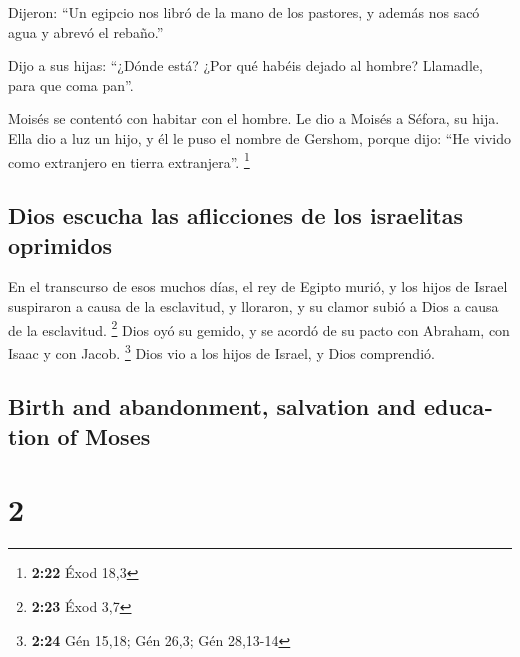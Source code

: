 \begin{paracol}{2}
 Dijeron: ``Un egipcio nos libró de la mano de los
pastores, y además nos sacó agua y abrevó el rebaño.''

 Dijo a sus hijas: ``¿Dónde está? ¿Por qué habéis dejado
al hombre? Llamadle, para que coma pan''.

 Moisés se contentó con habitar con el hombre. Le dio a
Moisés a Séfora, su hija.  Ella dio a luz un hijo, y él
le puso el nombre de Gershom, porque dijo: ``He vivido como extranjero
en tierra extranjera''. \footnote{\textbf{2:22} Éxod 18,3}

\hypertarget{dios-escucha-las-aflicciones-de-los-israelitas-oprimidos}{%
\subsection{Dios escucha las aflicciones de los israelitas
oprimidos}\label{dios-escucha-las-aflicciones-de-los-israelitas-oprimidos}}

 En el transcurso de esos muchos días, el rey de Egipto
murió, y los hijos de Israel suspiraron a causa de la esclavitud, y
lloraron, y su clamor subió a Dios a causa de la esclavitud. \footnote{\textbf{2:23}
  Éxod 3,7}  Dios oyó su gemido, y se acordó de su pacto
con Abraham, con Isaac y con Jacob. \footnote{\textbf{2:24} Gén 15,18;
  Gén 26,3; Gén 28,13-14}  Dios vio a los hijos de
Israel, y Dios comprendió.

\switchcolumn
\begin{otherlanguage}{english}

\hypertarget{birth-and-abandonment-salvation-and-education-of-moses}{%
\subsection{Birth and abandonment, salvation and education of
Moses}\label{birth-and-abandonment-salvation-and-education-of-moses}}

\hypertarget{section-3}{%
\section{2}\label{section-3}}


\end{otherlanguage}
\end{paracol}
